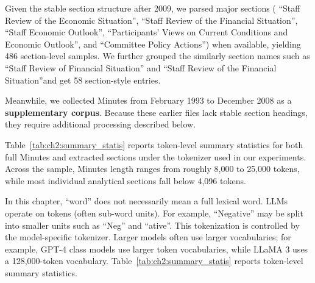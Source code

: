 Given the stable section structure after 2009, we parsed major sections ( ``Staff Review of the Economic Situation'', ``Staff Review of the Financial Situation'', ``Staff Economic Outlook'', ``Participants' Views on Current Conditions and Economic Outlook'', and ``Committee Policy Actions'') when available, yielding 486 section-level samples. We further grouped the similarly section names such as ``Staff Review of Financial Situation'' and ``Staff Review of the Financial Situation''and get 58 section-style entries. 


Meanwhile, we collected Minutes from February 1993 to December 2008 as a \textbf{supplementary corpus}. Because these earlier files lack stable section headings, they require additional processing described below.


Table~\ref{tab:ch2:summary_statis} reports token-level summary statistics for both full Minutes and extracted sections under the tokenizer used in our experiments. Across the sample, Minutes length ranges from roughly 8,000 to 25,000 tokens, while most individual analytical sections fall below 4,096 tokens.


In this chapter, ``word'' does not necessarily mean a full lexical word. LLMs operate on tokens (often sub-word units). For example, ``Negative'' may be split into smaller units such as ``Neg'' and ``ative''. This tokenization is controlled by the model-specific tokenizer. Larger models often use larger vocabularies; for example, GPT-4 class models use larger token vocabularies, while LLaMA 3 uses a 128,000-token vocabulary. Table~\ref{tab:ch2:summary_statis} reports token-level summary statistics.


